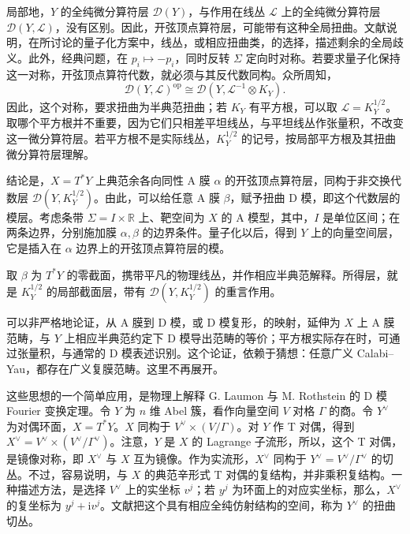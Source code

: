 局部地，$Y$ 的全纯微分算符层 $\mathcal{D}(Y)$，与作用在线丛 $\mathcal{L}$ 上的全纯微分算符层 $\mathcal{D}(Y,\mathcal{L})$，没有区别。因此，开弦顶点算符层，可能带有这种全局扭曲。文献说明，在所讨论的量子化方案中，线丛，或相应扭曲类，的选择，描述剩余的全局歧义。此外，经典问题，在 $p_i\mapsto-p_i$，同时反转 $\Sigma$ 定向时对称。若要求量子化保持这一对称，开弦顶点算符代数，就必须与其反代数同构。众所周知，
\[
\mathcal{D}(Y,\mathcal{L})^{\mathrm{op}}
\cong\mathcal{D}(Y,\mathcal{L}^{-1}\otimes K_Y).
\]
因此，这个对称，要求扭曲为半典范扭曲；若 $K_Y$ 有平方根，可以取 $\mathcal{L}=K_Y^{1/2}$。取哪个平方根并不重要，因为它们只相差平坦线丛，与平坦线丛作张量积，不改变这一微分算符层。若平方根不是实际线丛，$K_Y^{1/2}$ 的记号，按局部平方根及其扭曲微分算符层理解。

结论是，$X=T^*Y$ 上典范余各向同性 A 膜 $\alpha$ 的开弦顶点算符层，同构于非交换代数层 $\mathcal{D}(Y,K_Y^{1/2})$。由此，可以给任意 A 膜 $\beta$，赋予扭曲 D 模，即这个代数层的模层。考虑条带 $\Sigma=I\times\mathbb{R}$ 上、靶空间为 $X$ 的 A 模型，其中，$I$ 是单位区间；在两条边界，分别施加膜 $\alpha,\beta$ 的边界条件。量子化以后，得到 $Y$ 上的向量空间层，它是插入在 $\alpha$ 边界上的开弦顶点算符层的模。
\begin{example*}
取 $\beta$ 为 $T^*Y$ 的零截面，携带平凡的物理线丛，并作相应半典范解释。所得层，就是 $K_Y^{1/2}$ 的局部截面层，带有 $\mathcal{D}(Y,K_Y^{1/2})$ 的重言作用。
\end{example*}

可以非严格地论证，从 A 膜到 D 模，或 D 模复形，的映射，延伸为 $X$ 上 A 膜范畴，与 $Y$ 上相应半典范约定下 D 模导出范畴的等价；平方根实际存在时，可通过张量积，与通常的 D 模表述识别。这个论证，依赖于猜想：任意广义 Calabi--Yau，都存在广义复膜范畴。这里不再展开。

这些思想的一个简单应用，是物理上解释 G. Laumon 与 M. Rothstein 的 D 模 Fourier 变换定理。令 $Y$ 为 $n$ 维 Abel 簇，看作向量空间 $V$ 对格 $\Gamma$ 的商。令 $Y^\vee$ 为对偶环面，$X=T^*Y$。$X$ 同构于 $V^\vee\times(V/\Gamma)$。对 $Y$ 作 T 对偶，得到 $X^\vee=V^\vee\times(V^\vee/\Gamma^\vee)$。注意，$Y$ 是 $X$ 的 Lagrange 子流形，所以，这个 T 对偶，是镜像对称，即 $X^\vee$ 与 $X$ 互为镜像。作为实流形，$X^\vee$ 同构于 $Y^\vee=V^\vee/\Gamma^\vee$ 的切丛。不过，容易说明，与 $X$ 的典范辛形式 T 对偶的复结构，并非乘积复结构。一种描述方法，是选择 $V^\vee$ 上的实坐标 $v^j$；若 $y^j$ 为环面上的对应实坐标，那么，$X^\vee$ 的复坐标为 $y^j+\mathrm{i}v^j$。文献把这个具有相应全纯仿射结构的空间，称为 $Y^\vee$ 的扭曲切丛。

